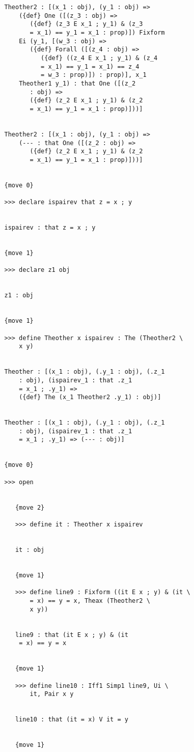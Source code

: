 \documentclass[12pt]{article}
\begin{document}
\begin{verbatim}
   Theother2 : [(x_1 : obj), (y_1 : obj) => 
       ({def} One ([(z_3 : obj) => 
          ({def} (z_3 E x_1 ; y_1) & (z_3 
          = x_1) == y_1 = x_1 : prop)]) Fixform 
       Ei (y_1, [(w_3 : obj) => 
          ({def} Forall ([(z_4 : obj) => 
             ({def} ((z_4 E x_1 ; y_1) & (z_4 
             = x_1) == y_1 = x_1) == z_4 
             = w_3 : prop)]) : prop)], x_1 
       Theother1 y_1) : that One ([(z_2 
          : obj) => 
          ({def} (z_2 E x_1 ; y_1) & (z_2 
          = x_1) == y_1 = x_1 : prop)]))]


   Theother2 : [(x_1 : obj), (y_1 : obj) => 
       (--- : that One ([(z_2 : obj) => 
          ({def} (z_2 E x_1 ; y_1) & (z_2 
          = x_1) == y_1 = x_1 : prop)]))]


   {move 0}

   >>> declare ispairev that z = x ; y


   ispairev : that z = x ; y


   {move 1}

   >>> declare z1 obj


   z1 : obj


   {move 1}

   >>> define Theother x ispairev : The (Theother2 \
       x y)


   Theother : [(x_1 : obj), (.y_1 : obj), (.z_1 
       : obj), (ispairev_1 : that .z_1 
       = x_1 ; .y_1) => 
       ({def} The (x_1 Theother2 .y_1) : obj)]


   Theother : [(x_1 : obj), (.y_1 : obj), (.z_1 
       : obj), (ispairev_1 : that .z_1 
       = x_1 ; .y_1) => (--- : obj)]


   {move 0}

   >>> open


      {move 2}

      >>> define it : Theother x ispairev


      it : obj


      {move 1}

      >>> define line9 : Fixform ((it E x ; y) & (it \
          = x) == y = x, Theax (Theother2 \
          x y))


      line9 : that (it E x ; y) & (it 
       = x) == y = x


      {move 1}

      >>> define line10 : Iff1 Simp1 line9, Ui \
          it, Pair x y


      line10 : that (it = x) V it = y


      {move 1}


\end{verbatim}
\end{document}
